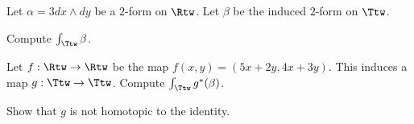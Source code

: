 Let $\alpha=3dx\wedge dy$ be a $2$-form on $\Rtw$. Let $\beta$ be the
induced $2$-form on $\Ttw$.
\begin{alist}
\item Compute $\int_{\Ttw}\beta$.
\item Let $f:\Rtw\rightarrow \Rtw$ be the map $f(x,y)=(5
x+2y,4x+3y)$. This induces a map $g:\Ttw\rightarrow \Ttw$. Compute
$\int_{\Ttw}g^*(\beta)$.
\item Show that $g$ is not homotopic to the identity.
\end{alist}
